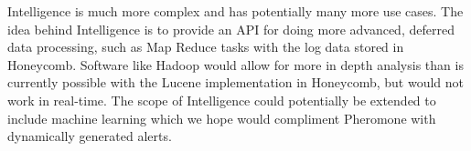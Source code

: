 Intelligence is much more complex and has potentially many more use cases. The
idea behind Intelligence is to provide an API for doing more advanced, deferred
data processing, such as Map Reduce tasks with the log data stored in
Honeycomb. Software like Hadoop\cite{hadoop} would allow for more in depth analysis than
is currently possible with the Lucene implementation in Honeycomb, but would
not work in real-time. The scope of Intelligence could potentially be extended
to include machine learning which we hope would compliment Pheromone with
dynamically generated alerts.
